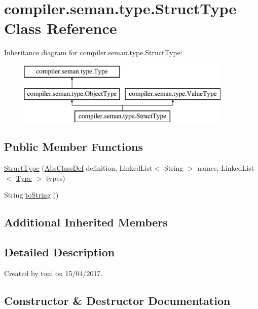 \hypertarget{classcompiler_1_1seman_1_1type_1_1_struct_type}{}\section{compiler.\+seman.\+type.\+Struct\+Type Class Reference}
\label{classcompiler_1_1seman_1_1type_1_1_struct_type}
Inheritance diagram for compiler.\+seman.\+type.\+Struct\+Type\+:\begin{figure}[H]
\begin{center}
\leavevmode
\includegraphics[height=3.000000cm]{classcompiler_1_1seman_1_1type_1_1_struct_type}
\end{center}
\end{figure}
\subsection*{Public Member Functions}
\begin{DoxyCompactItemize}
\item 
\hyperlink{classcompiler_1_1seman_1_1type_1_1_struct_type_a4ab9a389d6bd6c1406f494f99f3b8fd1}{Struct\+Type} (\hyperlink{classcompiler_1_1abstr_1_1tree_1_1def_1_1_abs_class_def}{Abs\+Class\+Def} definition, Linked\+List$<$ String $>$ names, Linked\+List$<$ \hyperlink{classcompiler_1_1seman_1_1type_1_1_type}{Type} $>$ types)
\item 
String \hyperlink{classcompiler_1_1seman_1_1type_1_1_struct_type_acc320486c4b9cdd552b7b6ce34e981ff}{to\+String} ()
\end{DoxyCompactItemize}
\subsection*{Additional Inherited Members}


\subsection{Detailed Description}
Created by toni on 15/04/2017. 

\subsection{Constructor \& Destructor Documentation}
\mbox{\label{classcompiler_1_1seman_1_1type_1_1_struct_type_a4ab9a389d6bd6c1406f494f99f3b8fd1}} 
